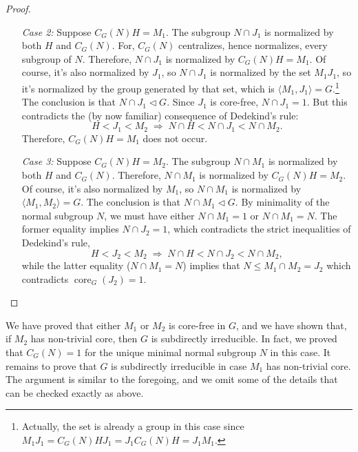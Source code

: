 \documentclass[11pt]{amsart}
\theoremstyle{plain}
\theoremstyle{definition}
\theoremstyle{remark}
\numberwithin{theorem}{section}
\numberwithin{claim}{section}
\numberwithin{equation}{section}
\numberwithin{conjecture}{section}
\newcommand{\<}{\ensuremath{\langle}}
\renewcommand{\>}{\ensuremath{\rangle}}
\renewcommand{\leq}{\ensuremath{\leqslant}}
\newcommand{\ssubnormal}{\ensuremath{\vartriangleleft}}
\newcommand{\core}{\ensuremath{\operatorname{core}}}
\newcommand{\0}{\ensuremath{\mathbf{0}}}
\newcommand{\1}{\ensuremath{\mathbf{1}}}
\newcommand{\2}{\ensuremath{\mathbf{2}}}
\newcommand{\3}{\ensuremath{\mathbf{3}}}
\newcommand{\4}{\ensuremath{\mathbf{4}}}
\newcommand{\5}{\ensuremath{\mathbf{5}}}
\begin{document}
\begin{proof}
\begin{enumerate}
\item[{\it Case 2:}]
Suppose $C_G(N)H =M_1$.  The subgroup $N\cap J_1$ is
normalized by both $H$ and $C_G(N)$. For, $C_G(N)$ centralizes, hence
normalizes, every subgroup of $N$.  Therefore, $N\cap J_1$ is normalized by 
$C_G(N)H =M_1$.  Of course, it's also normalized by $J_1$, so
$N\cap J_1$ is normalized by the set $M_1J_1$, so it's normalized by the group
generated by that set, which is $\<M_1, J_1\> = G$.\footnote{Actually, the set is
already a group in this case since $M_1J_1 = C_G(N)H J_1 = J_1 C_G(N)H = J_1 M_1$.}
The conclusion is that $N\cap J_1\ssubnormal G$.  
Since $J_1$ is core-free, $N\cap J_1 = 1$.
But this contradicts the (by now familiar) consequence of
Dedekind's rule:  
\[
H < J_1 < M_2  \; \Longrightarrow \; N\cap H < N\cap J_1 < N\cap M_2.
\]
 Therefore, $C_G(N)H =M_1$ does not occur.

\item[{\it Case 3:}]
Suppose $C_G(N)H = M_2$.
The subgroup $N\cap M_1$ is
normalized by both $H$ and $C_G(N)$.  Therefore, $N\cap M_1$ is normalized by 
$C_G(N)H =M_2$.  Of course, it's also normalized by $M_1$, so
$N\cap M_1$ is normalized by $\<M_1, M_2\> = G$.
The conclusion is that $N\cap M_1\ssubnormal G$.  By 
minimality of the normal subgroup $N$, we must have either $N\cap M_1 = 1$ or 
$N\cap M_1 = N$.  The former equality implies $N\cap J_2=1$, which contradicts 
the strict inequalities of Dedekind's rule,
\begin{equation}
  \label{eq:6}
H < J_2 < M_2  \; \Longrightarrow \; N\cap H < N\cap J_2 < N\cap M_2,
\end{equation}
while the latter equality ($N\cap M_1 = N$) implies that $N \leq M_1 \cap M_2 = J_2$ which
contradicts 
$\core_G(J_2)=1$. 
\end{enumerate}
\end{proof}

We have proved that either $M_1$ or $M_2$ is core-free in $G$, and
we have shown that, if $M_2$ has non-trivial core, then $G$ is subdirectly
irreducible.  In fact, we proved that $C_G(N)=1$ for the unique minimal normal subgroup
$N$ in this case.  It remains to prove that $G$ is subdirectly irreducible in
case $M_1$ has non-trivial core. The argument is similar to the foregoing, and
we omit some of the details that can be checked exactly as above.
\end{document}
